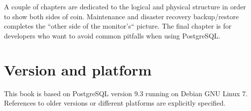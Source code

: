 \documentclass[oneside]{book}
\begin{document}
A couple of chapters are dedicated to the logical and physical structure in
order to show both sides of coin.  Maintenance and disaster recovery
backup/restore completes the ``other side of the monitor's`` picture.
The final chapter is for developers who want to avoid common pitfalls when
using PostgreSQL.

\section*{Version and platform}
This book is based on PostgreSQL version 9.3 running on Debian GNU Linux 7.
References to older versions or different platforms are explicitly specified.













\appendix

\listoffigures
\listoftables
\printindex{}
\end{document}
